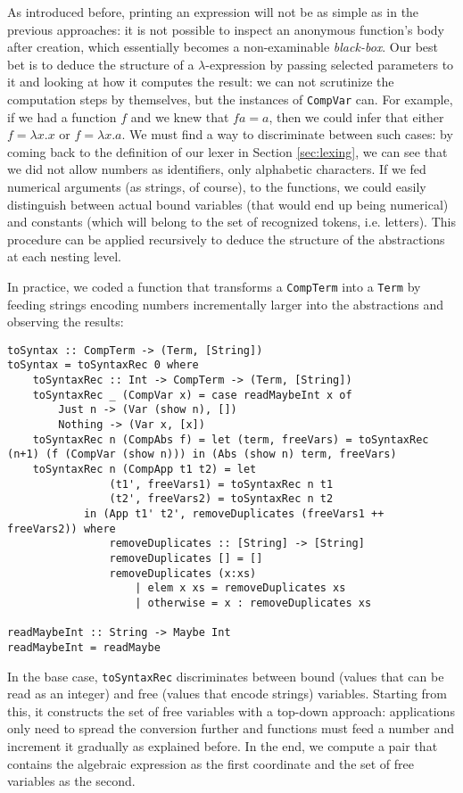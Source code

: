 \documentclass{article}
\begin{document}
As introduced before, printing an expression will not be as simple as in the previous approaches: it is not possible to inspect an anonymous function's body after creation, which essentially becomes a non-examinable \textit{black-box}. Our best bet is to deduce the structure of a $\lambda$-expression by passing selected parameters to it and looking at how it computes the result: we can not scrutinize the computation steps by themselves, but the instances of \lstinline|CompVar| can. For example, if we had a function $f$ and we knew that $f a = a$, then we could infer that either $f = \lambda x . x$ or $f = \lambda x . a$. We must find a way to discriminate between such cases: by coming back to the definition of our lexer in Section \ref{sec:lexing}, we can see that we did not allow numbers as identifiers, only alphabetic characters. If we fed numerical arguments (as strings, of course), to the functions, we could easily distinguish between actual bound variables (that would end up being numerical) and constants (which will belong to the set of recognized tokens, i.e. letters). This procedure can be applied recursively to deduce the structure of the abstractions at each nesting level.

In practice, we coded a function that transforms a \lstinline|CompTerm| into a \lstinline|Term| by feeding strings encoding numbers incrementally larger into the abstractions and observing the results:

\begin{lstlisting}
toSyntax :: CompTerm -> (Term, [String])
toSyntax = toSyntaxRec 0 where
    toSyntaxRec :: Int -> CompTerm -> (Term, [String])
    toSyntaxRec _ (CompVar x) = case readMaybeInt x of
        Just n -> (Var (show n), [])
        Nothing -> (Var x, [x])
    toSyntaxRec n (CompAbs f) = let (term, freeVars) = toSyntaxRec (n+1) (f (CompVar (show n))) in (Abs (show n) term, freeVars)
    toSyntaxRec n (CompApp t1 t2) = let
                (t1', freeVars1) = toSyntaxRec n t1
                (t2', freeVars2) = toSyntaxRec n t2
            in (App t1' t2', removeDuplicates (freeVars1 ++ freeVars2)) where
                removeDuplicates :: [String] -> [String]
                removeDuplicates [] = []
                removeDuplicates (x:xs)
                    | elem x xs = removeDuplicates xs
                    | otherwise = x : removeDuplicates xs

readMaybeInt :: String -> Maybe Int
readMaybeInt = readMaybe
\end{lstlisting}

In the base case, \lstinline|toSyntaxRec| discriminates between bound (values that can be read as an integer) and free (values that encode strings) variables. Starting from this, it constructs the set of free variables with a top-down approach: applications only need to spread the conversion further and functions must feed a number and increment it gradually as explained before. In the end, we compute a pair that contains the algebraic expression as the first coordinate and the set of free variables as the second.
\end{document}
